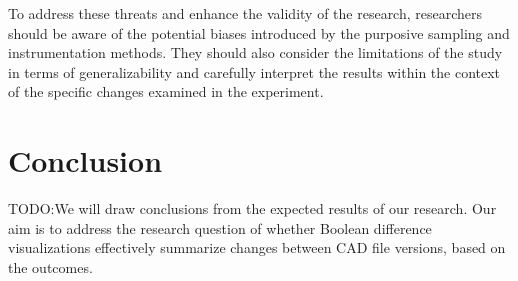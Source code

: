 \documentclass[sigconf,authorversion,nonacm]{acmart}
\begin{document}
To address these threats and enhance the validity of the research, researchers should be aware of the potential biases introduced by the purposive sampling and instrumentation methods.
They should also consider the limitations of the study in terms of generalizability and carefully interpret the results within the context of the specific changes examined in the experiment.

\section{Conclusion}

TODO:We will draw conclusions from the expected results of our research. Our aim is to address the research question of whether Boolean difference visualizations effectively summarize changes between CAD file versions, based on the outcomes.





\end{document}
